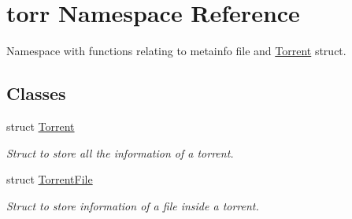 \hypertarget{namespacetorr}{}\section{torr Namespace Reference}
\label{namespacetorr}


Namespace with functions relating to metainfo file and \hyperlink{structtorr_1_1Torrent}{Torrent} struct.  


\subsection*{Classes}
\begin{DoxyCompactItemize}
\item 
struct \hyperlink{structtorr_1_1Torrent}{Torrent}
\begin{DoxyCompactList}\small\item\em Struct to store all the information of a torrent. \end{DoxyCompactList}\item 
struct \hyperlink{structtorr_1_1TorrentFile}{Torrent\+File}
\begin{DoxyCompactList}\small\item\em Struct to store information of a file inside a torrent. \end{DoxyCompactList}\end{DoxyCompactItemize}
